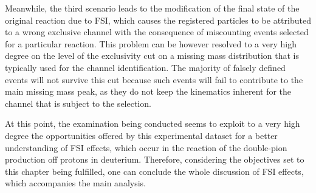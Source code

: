Meanwhile, the third scenario leads to the modification of the final state of the original reaction due to FSI, which causes the registered particles to be attributed to a wrong exclusive channel with the consequence of miscounting events selected for a particular reaction. This problem can be however resolved to a very high degree on the level of the exclusivity cut on a missing mass distribution that is typically used for the channel identification. The majority of falsely defined events will not survive this cut because such events will fail to contribute to the main missing mass peak, as they do not keep the kinematics inherent for the channel that is subject to the selection.


At this point, the examination being conducted seems to exploit to a very high degree the opportunities offered by this experimental dataset for a better understanding of FSI effects, which occur in the reaction of the double-pion production off protons in deuterium. Therefore, considering the objectives set to this chapter being fulfilled, one can conclude the whole discussion of FSI effects, which accompanies the main analysis. 

















